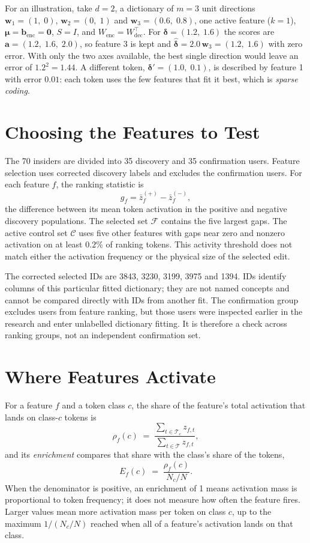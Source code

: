 \documentclass[12pt]{report}
\begin{document}
For an illustration, take $d = 2$, a dictionary of $m = 3$ unit directions $\mathbf{w}_1 = (1,\;0)$,
$\mathbf{w}_2 = (0,\;1)$ and $\mathbf{w}_3 = (0.6,\;0.8)$, one active feature ($k = 1$),
$\boldsymbol{\mu}=\mathbf{b}_{\mathrm{enc}}=\mathbf{0}$, $S=I$, and $W_{\mathrm{enc}} = W_{\mathrm{dec}}^\top$. For
$\boldsymbol{\delta} = (1.2,\;1.6)$ the scores are $\mathbf{a} = (1.2,\;1.6,\;2.0)$, so feature 3
is kept and $\widehat{\boldsymbol{\delta}} = 2.0\,\mathbf{w}_3 = (1.2,\;1.6)$ with zero error.
With only the two axes available, the best single direction would leave an error of
$1.2^2 = 1.44$. A different token, $\boldsymbol{\delta}' = (1.0,\;0.1)$, is described by feature 1
with error $0.01$: each token uses the few features that fit it best, which is \emph{sparse
coding}.

\section{Choosing the Features to Test}
The 70 insiders are divided into 35 discovery and 35 confirmation users. Feature selection
uses corrected discovery labels and excludes the confirmation users. For each feature $f$,
the ranking statistic is
\begin{equation}
g_f=\bar z_f^{(+)}-\bar z_f^{(-)},
\label{eq:gap}
\end{equation}
the difference between its mean token activation in the positive and negative discovery
populations. The selected set $\mathcal{F}$ contains the five largest gaps. The active
control set $\mathcal{C}$ uses five other features with gaps near zero and nonzero activation
on at least $0.2\%$ of ranking tokens. This activity threshold does not match either the
activation frequency or the physical size of the selected edit.

The corrected selected IDs are 3843, 3230, 3199, 3975 and 1394. IDs identify columns of this
particular fitted dictionary; they are not named concepts and cannot be compared directly
with IDs from another fit. The confirmation group excludes users from feature ranking,
but those users were inspected earlier in the research and enter unlabelled dictionary
fitting. It is therefore a check across ranking groups, not an independent confirmation set.

\section{Where Features Activate}
For a feature $f$ and a token class $c$, the share of the feature's total activation that
lands on class-$c$ tokens is
\begin{equation}
\rho_f(c) \;=\; \frac{\sum_{t \in \mathcal{T}_c} z_{f,t}}{\sum_{t \in \mathcal{T}} z_{f,t}},
\label{eq:attribution}
\end{equation}
and its \emph{enrichment} compares that share with the class's share of the tokens,
\[
E_f(c) \;=\; \frac{\rho_f(c)}{N_c / N}.
\]
When the denominator is positive, an enrichment of 1 means activation mass is proportional
to token frequency; it does not measure how often the feature fires. Larger values mean
more activation mass per token on class $c$, up to the maximum $1/(N_c/N)$ reached when all
of a feature's activation lands on that class.
\end{document}
